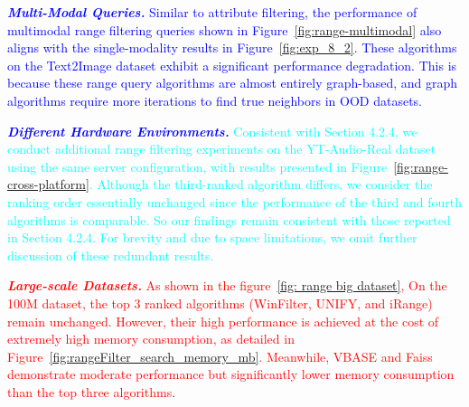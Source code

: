 \documentclass[sigconf, nonacm]{acmart}
\begin{document}
{	\textit{\textbf{\textcolor{blue}{Multi-Modal Queries.}}}
	\textcolor{blue}{
		Similar to attribute filtering, the performance of multimodal range filtering queries shown in Figure~\ref{fig:range-multimodal} also aligns with the single-modality results in Figure~\ref{fig:exp_8_2}. These algorithms on the Text2Image dataset exhibit a significant performance degradation. This is because these range query algorithms are almost entirely graph-based, and graph algorithms require more iterations to find true neighbors in OOD datasets.
		}
		
	\textit{\textbf{\textcolor{blue}{Different Hardware Environments.}}} 
	\textcolor{cyan}{Consistent with Section 4.2.4, we conduct additional range filtering experiments on the YT-Audio-Real dataset using the same server configuration, with results presented in Figure~\ref{fig:range-cross-platform}. Although the third-ranked algorithm differs, we consider the ranking order essentially unchanged since the performance of the third and fourth algorithms is comparable. So our findings remain consistent with those reported in Section 4.2.4. For brevity and due to space limitations, we omit further discussion of these redundant results.}
	
	\textit{\textbf{\textcolor{red}{Large-scale Datasets.}}} \textcolor{red}{As shown in the figure~\ref{fig: range big dataset}, On the 100M dataset, the top 3 ranked algorithms (WinFilter, UNIFY, and iRange) remain unchanged. However, their high performance is achieved at the cost of extremely high memory consumption, as detailed in Figure~\ref{fig:rangeFilter_search_memory_mb}. Meanwhile, VBASE and Faiss demonstrate moderate performance but significantly lower memory consumption than the top three algorithms}.
	
}
\end{document}
